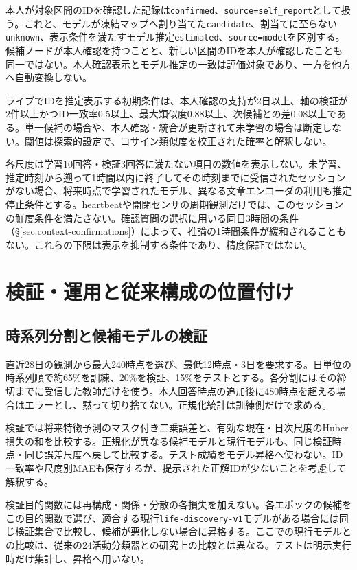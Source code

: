本人が対象区間のIDを確認した記録は\texttt{confirmed}、\texttt{source=self\_report}として扱う。これと、モデルが凍結マップへ割り当てた\texttt{candidate}、割当てに至らない\texttt{unknown}、表示条件を満たすモデル推定\texttt{estimated}、\texttt{source=model}を区別する。候補ノードが本人確認を持つことと、新しい区間のIDを本人が確認したことも同一ではない。本人確認表示とモデル推定の一致は評価対象であり、一方を他方へ自動変換しない。

ライブでIDを推定表示する初期条件は、本人確認の支持が2日以上、軸の検証が2件以上かつID一致率0.5以上、最大類似度0.88以上、次候補との差0.08以上である。単一候補の場合や、本人確認・統合が更新されて未学習の場合は断定しない。閾値は探索的設定で、コサイン類似度を校正された確率と解釈しない。

各尺度は学習10回答・検証3回答に満たない項目の数値を表示しない。未学習、推定時刻から遡って1時間以内に終了してその時刻までに受信されたセッションがない場合、将来時点で学習されたモデル、異なる文章エンコーダの利用も推定停止条件とする。heartbeatや開閉センサの周期観測だけでは、このセッションの鮮度条件を満たさない。確認質問の選択に用いる同日3時間の条件（§\ref{sec:context-confirmations}）によって、推論の1時間条件が緩和されることもない。これらの下限は表示を抑制する条件であり、精度保証ではない。

\section{検証・運用と従来構成の位置付け}
\label{sec:legacy-and-deployment}

\subsection{時系列分割と候補モデルの検証}

直近28日の観測から最大240時点を選び、最低12時点・3日を要求する。日単位の時系列順で約65\%を訓練、20\%を検証、15\%をテストとする。各分割にはその締切までに受信した教師だけを使う。本人回答時点の追加後に480時点を超える場合はエラーとし、黙って切り捨てない。正規化統計は訓練側だけで求める。

検証では将来特徴予測のマスク付き二乗誤差と、有効な現在・日次尺度のHuber損失の和を比較する。正規化が異なる候補モデルと現行モデルも、同じ検証時点・同じ誤差尺度へ戻して比較する。テスト成績をモデル昇格へ使わない。ID一致率や尺度別MAEも保存するが、提示された正解IDが少ないことを考慮して解釈する。

検証目的関数には再構成・関係・分散の各損失を加えない。各エポックの候補をこの目的関数で選び、適合する現行\texttt{life-discovery-v1}モデルがある場合には同じ検証集合で比較し、候補が悪化しない場合に昇格する。ここでの現行モデルとの比較は、従来の24活動分類器との研究上の比較とは異なる。テストは明示実行時だけ集計し、昇格へ用いない。


